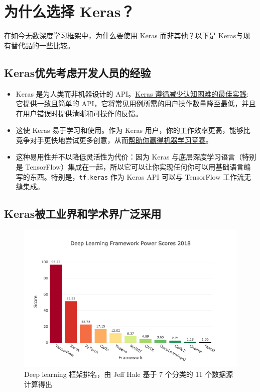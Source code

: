 \section{为什么选择 Keras？}
在如今无数深度学习框架中，为什么要使用 Keras 而非其他？以下是 Keras与现有替代品的一些比较。


\subsection{Keras优先考虑开发人员的经验}

\begin{itemize}
\item
  Keras 是为人类而非机器设计的
  API。\href{https://blog.keras.io/user-experience-design-for-apis.html}{Keras
  遵循减少认知困难的最佳实践}: 它提供一致且简单的
  API，它将常见用例所需的用户操作数量降至最低，并且在用户错误时提供清晰和可操作的反馈。
\item
  这使 Keras 易于学习和使用。作为 Keras
  用户，你的工作效率更高，能够比竞争对手更快地尝试更多创意，从而\href{https://www.quora.com/Why-has-Keras-been-so-successful-lately-at-Kaggle-competitions}{帮助你赢得机器学习竞赛}。
\item
  这种易用性并不以降低灵活性为代价：因为 Keras
  与底层深度学习语言（特别是
  TensorFlow）集成在一起，所以它可以让你实现任何你可以用基础语言编写的东西。特别是，\texttt{tf.keras}
  作为 Keras API 可以与 TensorFlow 工作流无缝集成。
\end{itemize}


\subsection{Keras被工业界和学术界广泛采用}

\begin{figure}[h]
\begin{center}
\includegraphics[width=\textwidth]{figure/framework_rank.png}
\end{center}
\caption{Deep learning 框架排名，由 Jeff Hale 基于 7 个分类的 11 个数据源计算得出}
\end{figure}

